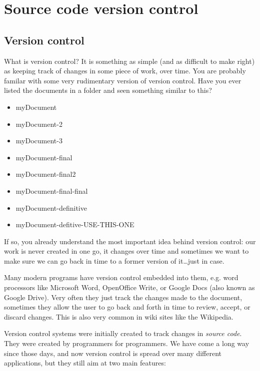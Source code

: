 \chapter{Source code version control}
\label{sec:source-code-version}

\section{Version control}
\label{sec:version-control}

What is version control? It is something as simple (and as difficult
to make right) as keeping track of changes in some piece of work, over
time. You
are probably familar with some very rudimentary version of version
control. Have you ever listed the documents in a folder and seen
something similar to this?

\begin{itemize}
\item myDocument
\item myDocument-2
\item myDocument-3
\item myDocument-final
\item myDocument-final2
\item myDocument-final-final
\item myDocument-definitive
\item myDocument-defitive-USE-THIS-ONE
\end{itemize}

If so, you already understand the most important idea behind version
control: our work is never created in one go, it changes over time and
sometimes we want to make sure we can go back in time to a former
version of it\ldots just in case. 

Many modern programs have version control embedded into them,
e.g. word processors like Microsoft Word, OpenOffice Write, or Google
Docs (also known as Google Drive). Very often they just track the
changes made to the document, sometimes they allow the user to go back
and forth in time to review, accept, or discard changes. This is also
very common in wiki sites like the Wikipedia. 


Version control systems were initially created to track changes in
\emph{source code}. They were created by programmers for
programmers. We have come a long way since those days, and now version
control is spread over many different applications, but they still aim
at two main features: 

